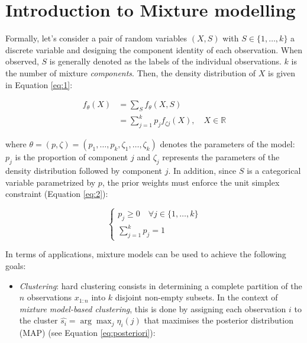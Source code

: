 \hypertarget{introduction-to-mixture-modelling}{%
\section{Introduction to Mixture modelling}\label{introduction-to-mixture-modelling}}

Formally, let's consider a pair of random variables \((X,S)\) with \(S \in \{1, \ldots, k\}\) a discrete variable and designing
the component identity of each observation. When observed, \(S\) is
generally denoted as the labels of the individual observations. \(k\) is
the number of mixture \emph{components}. Then, the density distribution of
\(X\) is given in Equation \eqref{eq:1}:

\begin{equation}
\begin{split}
f_\theta(X) &= \sum_S f_\theta (X, S) \\
&= \sum_{j=1}^k p_j f_{\zeta j}(X), \quad X\in\mathbb{R}
\end{split}
\label{eq:1}
\end{equation}

where \(\theta = (p, \zeta) = (p_1, \ldots, p_k, \zeta_1, \ldots, \zeta_k)\)
denotes the parameters of the model: \(p_j\) is the proportion of
component \(j\) and \(\zeta_j\) represents the parameters of the density
distribution followed by component \(j\). In addition, since \(S\) is a categorical variable parametrized by \(p\), the prior weights must enforce the unit simplex constraint (Equation \eqref{eq:2}):

\begin{equation}
\begin{cases}
p_j \ge 0 \quad \forall j \in \{1, \ldots, k \}\\
\sum_{j=1}^k p_j =1
\end{cases}
\label{eq:2}
\end{equation}

In terms of applications, mixture models can be used to achieve the
following goals:

\begin{itemize}
\tightlist
\item
  \emph{Clustering}: hard clustering consists in determining a complete
  partition of the \(n\) observations \(x_{1:n}\) into \(k\) disjoint
  non-empty subsets. In the context of \emph{mixture model-based
  clustering}, this is done by assigning each observation \(i\) to the
  cluster \(\hat{s_i}=\arg \max_j \eta_{i} (j)\) that maximises the
  posterior distribution (MAP) (see Equation
  \eqref{eq:posteriori}):
\end{itemize}

